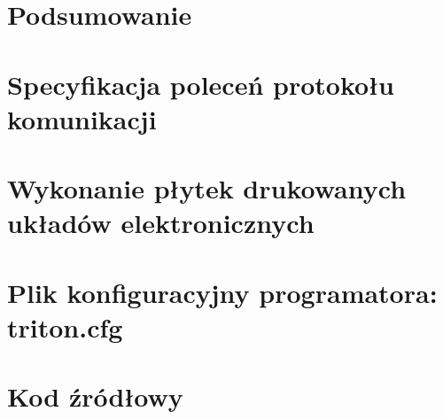 \documentclass[a4paper,12pt, oneside]{mwbk}
\begin{document}
\newpage
\chapter*{Podsumowanie}


\newpage 
\appendix
\chapter{Specyfikacja poleceń protokołu komunikacji}

\chapter{Wykonanie płytek drukowanych układów elektronicznych}

\chapter{Plik konfiguracyjny programatora: triton.cfg}

\chapter*{Kod źródłowy}
%
\listoffigures
\listoftables

\newpage

{}


\newpage
\end{document}
